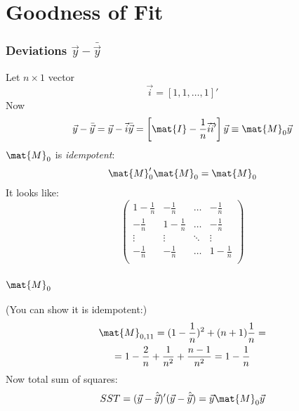 \documentclass[mathserif, xcolor=table, svgnames]{beamer}
\begin{document}
{

}

\section{Goodness of Fit}
\frame{\tableofcontents[currentsection]}

{

}

\begin{frame}
  \frametitle{Deviations $\vec{y} - \bar{\vec{y}}$}
  Let $n\times 1$ vector
  \begin{equation*}
    \vec{i} = [1,1,\dots,1]'
  \end{equation*}
  Now
  \begin{equation*}
    \vec{y} - \bar{\vec{y}} = 
    \vec{y} - \vec{i} \bar{\vec{y}} = 
    \left[ \mat{I} - \frac{1}{n}\vec{i}\vec{i}' \right]
    \vec{y}
    \equiv
    \mat{M}_{0} \vec{y}
  \end{equation*}
  $\mat{M}_{0}$ is \emph{idempotent}:
  \begin{equation*}
    \mat{M}_{0}' \mat{M}_{0} = \mat{M}_{0}
  \end{equation*}
  It looks like:
  \begin{equation*}
    \begin{pmatrix}
      1 - \frac{1}{n} & -\frac{1}{n} & \dots &  -\frac{1}{n}\\
       -\frac{1}{n}   & 1 - \frac{1}{n} & \dots & -\frac{1}{n}\\
       \vdots         & \vdots          & \ddots & \vdots\\
        -\frac{1}{n}  &  -\frac{1}{n} & \hdots &  1 - \frac{1}{n}\\
    \end{pmatrix}
  \end{equation*}
\end{frame}

\begin{frame}
  \frametitle{$\mat{M}_0$}
  (You can show it is idempotent:)
  \begin{multline*}
    \mat{M}_{0,11} = (1 - \frac{1}{n})^{2}+ (n+1)\frac{1}{n} =\\
    = 1 - \frac{2}{n} + \frac{1}{n^{2}} + \frac{n-1}{n^{2}} = 1 -\frac{1}{n}
  \end{multline*}
  Now total sum of squares:
  \begin{equation*}
    SST = (\vec{y} - \hat{\vec{y}})' (\vec{y} - \hat{\vec{y}})
    =
    \vec{y} \mat{M}_{0} \vec{y}
  \end{equation*}
\end{frame}
\end{document}
